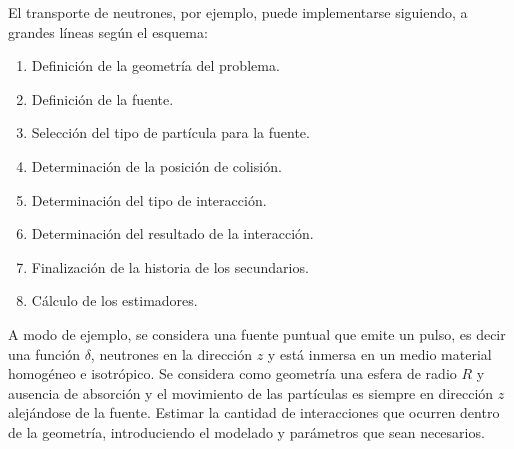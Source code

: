 El transporte de neutrones, por ejemplo, puede implementarse siguiendo, a grandes l\'ineas seg\'un el esquema:

\begin{enumerate}
 \item Definici\'on de la geometr\'ia del problema.
 \item Definici\'on de la fuente.
 \item Selecci\'on del tipo de part\'icula para la fuente.
 \item Determinaci\'on de la posici\'on de colisi\'on.
 \item Determinaci\'on del tipo de interacci\'on.
 \item Determinaci\'on del resultado de la interacci\'on.
 \item Finalizaci\'on de la historia de los secundarios.
 \item C\'alculo de los estimadores.
\end{enumerate}

A modo de ejemplo, se considera una fuente puntual que emite un pulso, es decir una funci\'on $\delta$, neutrones en la direcci\'on $z$ y
est\'a inmersa en un medio material homog\'eneo e isotr\'opico. Se considera como geometr\'ia una esfera de radio $R$ y ausencia de 
absorci\'on y el movimiento de las part\'iculas es siempre en direcci\'on $z$ alej\'andose de la fuente. Estimar
la cantidad de interacciones que ocurren dentro de la geometr\'ia, introduciendo el modelado y par\'ametros que sean necesarios.